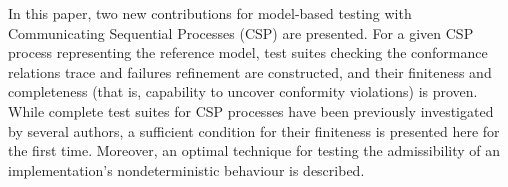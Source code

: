 In this paper, two new contributions for model-based testing with
Communicating Sequential Processes (CSP) are presented. For a given CSP
process representing the reference model, test suites checking the
conformance relations trace and failures refinement are constructed, and
their finiteness and completeness (that is, capability to uncover conformity
violations) is proven. While complete test suites for CSP processes have been
previously investigated by several authors, a sufficient condition for their
finiteness is presented here for the first time. Moreover, an optimal
technique for testing the admissibility of an implementation's
nondeterministic behaviour is described. 
